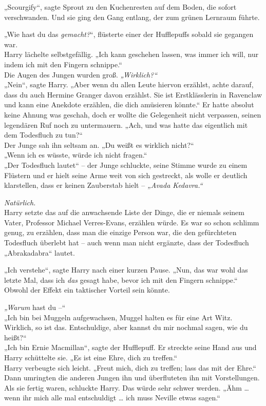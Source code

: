 {„Scourgify“, sagte Sprout zu den Kuchenresten auf dem Boden, die sofort verschwanden. Und sie ging den Gang entlang, der zum grünen Lernraum führte.

„Wie hast du das \emph{gemacht?}“, flüsterte einer der Hufflepuffs sobald sie gegangen war.\\ Harry lächelte selbstgefällig. „Ich kann geschehen lassen, was immer ich will, nur indem ich mit den Fingern schnippe.“\\ Die Augen des Jungen wurden groß. \emph{„Wirklich?“}\\ „Nein“, sagte Harry. „Aber wenn du allen Leute hiervon erzählst, achte darauf, dass du auch Hermine Granger davon erzählst. Sie ist Erstklässlerin in Ravenclaw und kann eine Anekdote erzählen, die dich amüsieren könnte.“ Er hatte absolut keine Ahnung was geschah, doch er wollte die Gelegenheit nicht verpassen, seinen legendären Ruf noch zu untermauern. „Ach, und was hatte das eigentlich mit dem Todesfluch zu tun?“\\ Der Junge sah ihn seltsam an. „Du weißt es wirklich nicht?“\\ „Wenn ich es wüsste, würde ich nicht fragen.“\\ „Der Todesfluch lautet“ -- der Junge schluckte, seine Stimme wurde zu einem Flüstern und er hielt seine Arme weit von sich gestreckt, als wolle er deutlich klarstellen, dass er keinen Zauberstab hielt -- \emph{„Avada Kedavra.“}

\emph{Natürlich.}\\ Harry setzte das auf die anwachsende Liste der Dinge, die er niemals seinem Vater, Professor Michael Verres-Evans, erzählen würde. Es war so schon schlimm genug, zu erzählen, dass man die einzige Person war, die den gefürchteten Todesfluch überlebt hat -- auch wenn man nicht ergänzte, dass der Todesfluch „Abrakadabra“ lautet.

„Ich verstehe“, sagte Harry nach einer kurzen Pause. „Nun, das war wohl das letzte Mal, dass ich \emph{das} gesagt habe, bevor ich mit den Fingern schnippe.“ Obwohl der Effekt ein taktischer Vorteil sein könnte.

\emph{„Warum} hast du --“\\ „Ich bin bei Muggeln aufgewachsen, Muggel halten es für eine Art Witz. Wirklich, so ist das. Entschuldige, aber kannst du mir nochmal sagen, wie du heißt?“\\ „Ich bin Ernie Macmillan“, sagte der Hufflepuff. Er streckte seine Hand aus und Harry schüttelte sie. „Es ist eine Ehre, dich zu treffen.“\\ Harry verbeugte sich leicht. „Freut mich, dich zu treffen; lass das mit der Ehre.“\\ Dann umringten die anderen Jungen ihn und überfluteten ihn mit Vorstellungen. Als sie fertig waren, schluckte Harry. Das würde sehr schwer werden. „Ähm … wenn ihr mich alle mal entschuldigt … ich muss Neville etwas sagen.“

}
